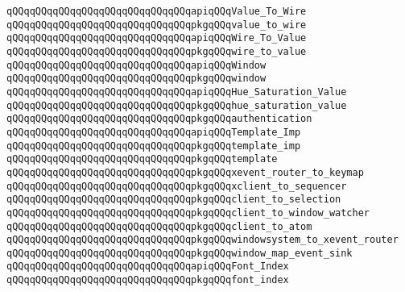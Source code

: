 \verb|qQQqqQQqqQQqqQQqqQQqqQQqqQQqqQQqapiqQQqValue_To_Wire|\newline
\verb|qQQqqQQqqQQqqQQqqQQqqQQqqQQqqQQqpkgqQQqvalue_to_wire|\newline
\newline
\verb|qQQqqQQqqQQqqQQqqQQqqQQqqQQqqQQqapiqQQqWire_To_Value|\newline
\verb|qQQqqQQqqQQqqQQqqQQqqQQqqQQqqQQqpkgqQQqwire_to_value|\newline
\newline
\verb|qQQqqQQqqQQqqQQqqQQqqQQqqQQqqQQqapiqQQqWindow|\newline
\verb|qQQqqQQqqQQqqQQqqQQqqQQqqQQqqQQqpkgqQQqwindow|\newline
\newline
\verb|qQQqqQQqqQQqqQQqqQQqqQQqqQQqqQQqapiqQQqHue_Saturation_Value|\newline
\verb|qQQqqQQqqQQqqQQqqQQqqQQqqQQqqQQqpkgqQQqhue_saturation_value|\newline
\newline
\verb|qQQqqQQqqQQqqQQqqQQqqQQqqQQqqQQqpkgqQQqauthentication|\newline
\newline
\verb|qQQqqQQqqQQqqQQqqQQqqQQqqQQqqQQqapiqQQqTemplate_Imp|\newline
\verb|qQQqqQQqqQQqqQQqqQQqqQQqqQQqqQQqpkgqQQqtemplate_imp|\newline
\verb|qQQqqQQqqQQqqQQqqQQqqQQqqQQqqQQqpkgqQQqtemplate|\newline
\newline
\verb|qQQqqQQqqQQqqQQqqQQqqQQqqQQqqQQqpkgqQQqxevent_router_to_keymap|\newline
\verb|qQQqqQQqqQQqqQQqqQQqqQQqqQQqqQQqpkgqQQqxclient_to_sequencer|\newline
\verb|qQQqqQQqqQQqqQQqqQQqqQQqqQQqqQQqpkgqQQqclient_to_selection|\newline
\verb|qQQqqQQqqQQqqQQqqQQqqQQqqQQqqQQqpkgqQQqclient_to_window_watcher|\newline
\verb|qQQqqQQqqQQqqQQqqQQqqQQqqQQqqQQqpkgqQQqclient_to_atom|\newline
\verb|qQQqqQQqqQQqqQQqqQQqqQQqqQQqqQQqpkgqQQqwindowsystem_to_xevent_router|\newline
\verb|qQQqqQQqqQQqqQQqqQQqqQQqqQQqqQQqpkgqQQqwindow_map_event_sink|\newline
\newline
\verb|qQQqqQQqqQQqqQQqqQQqqQQqqQQqqQQqapiqQQqFont_Index|\newline
\verb|qQQqqQQqqQQqqQQqqQQqqQQqqQQqqQQqpkgqQQqfont_index|\newline
